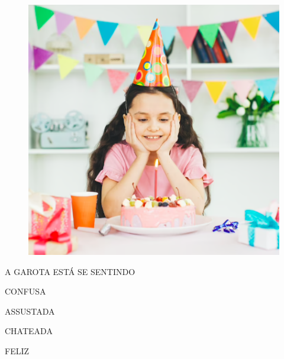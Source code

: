 \begin{figure}[htpb!]
\centering
\includegraphics[width=\textwidth]{media/image175c.png}
\end{figure}


A GAROTA ESTÁ SE SENTINDO

\begin{escolha}
\item CONFUSA

\item ASSUSTADA

\item CHATEADA

\item FELIZ
\end{escolha}


